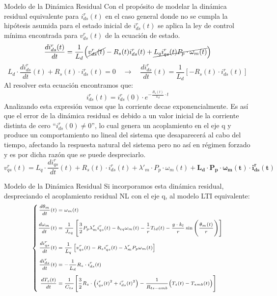 \documentclass[12pt]{beamer}
\begin{document}
\begin{frame}{Modelo de la Dinámica Residual}\scriptsize
    Con el propósito de modelar la dinámica residual equivalente para $i^r_{ds}(t)$ en el caso general donde no se cumpla la hipótesis asumida para el estado inicial de $i^r_{ds}(t)$ se aplica la ley de control mínima encontrada para $v^r_{ds}(t)$ de la ecuación de estado.
    \begin{equation}
    \frac{d i_{ds}^r(t)}{dt} = \frac{1}{L_d} \Big( \cancel{v_{ds}^r(t)} - R_s(t) i_{ds}^r(t) + \cancel{L_q i_{qs}^r(t) P_p \cdot \omega_m(t)} \Big)
    \end{equation}
    \begin{equation}
    L_d \cdot\frac{di^r_{ds}}{dt}(t) + R_s(t)\cdot i^r_{ds}(t) = 0 \quad \rightarrow \quad \frac{di^r_{ds}}{dt}(t) = \frac{1}{L_d}\left[-R_s(t)\cdot i^r_{ds}(t)\right]
    \end{equation}
    Al resolver esta ecuación encontramos que:
    \begin{equation}
    i^r_{ds}(t) = i^r_{ds}(0)\cdot e^{-\frac{R_s(t)}{L_d}\cdot t}
    \end{equation}
    Analizando esta expresión vemos que la corriente decae exponencialmente. Es así que el error de la dinámica residual es debido a un valor inicial de la corriente distinta de cero ``$i^r_{ds}(0) \neq 0$'', lo cual genera un acoplamiento en el eje q y produce un comportamiento no lineal del sistema que desaparecerá al cabo del tiempo, afectando la respuesta natural del sistema pero no así en régimen forzado y es por dicha razón que se puede despreciarlo.
    \begin{equation}
    v^r_{qs}(t) = L_q\cdot \frac{di^r_{qs}}{dt}(t) + R_s(t)\cdot i^r_{ds}(t) + \lambda'_m\cdot P_p\cdot\omega_m(t) + \boldsymbol{L_d\cdot P_p\cdot\omega_m(t)\cdot i^r_{ds}(t)}
    \end{equation}
\end{frame}

\begin{frame}{Modelo de la Dinámica Residual}\footnotesize
    Si incorporamos esta dinámica residual, despreciando el acoplamiento residual NL con el eje q, al modelo LTI equivalente:
\begin{equation}
\scriptsize
\left\{
\begin{aligned}
\frac{d\theta_m}{dt}(t) &= \omega_m(t) \\[1ex]
\frac{d\omega_m}{dt}(t) &= \frac{1}{J_{eq}}\left[\frac{3}{2}P_p\lambda^r_mi^r_{qs}(t) - b_{eq}\omega_m(t) - \frac{1}{r}T_{ld}(t) - \frac{g \cdot k_l}{r} \sin\Bigg(\frac{\theta_m(t)}{r}\Bigg)\right] \\[1ex]
\frac{di^r_{qs}}{dt}(t) &= \frac{1}{L_q}\left[v^r_{qs}(t) - R_si^r_{qs}(t) - \lambda^r_mP_p\omega_m(t)\right] \\[1ex]
\frac{di^r_{ds}}{dt}(t) &= -\frac{1}{L_d}R_s\cdot i^r_{ds}(t) \\[1ex]
\frac{d T_s(t)}{dt} &= \frac{1}{C_{ts}} \Bigg[ \frac{3}{2} R_s \cdot \big(i_{qs}^r(t)^2+i_{ds}^r(t)^2\big) - \frac{1}{R_{ts-amb}} \big( T_s(t) - T_{amb}(t) \big) \Bigg]
\end{aligned}
\right.
\label{eq:sistema_LTI_aumentado}
\end{equation}
\end{frame}
\end{document}
